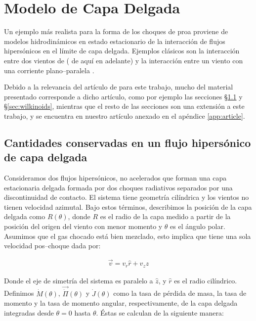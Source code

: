 \chapter{Modelo de Capa Delgada}
\label{chap:hipersonica}
\thispagestyle{empty}
\newcommand\CRW{\citetalias{Canto:1996}}

Un ejemplo más realista para la forma de los choques de proa proviene de modelos hidrodinámicos en estado estacionario de la interacción de flujos hipersónicos en el límite de capa delgada. Ejemplos clásicos son la interacción entre dos vientos de \citet{Canto:1996} (\CRW{} de aquí en adelante) y la interacción entre un viento con una corriente plano--paralela \citep{Wilkin:1996}.

Debido a la relevancia del artículo de \CRW{} para este trabajo, mucho del material presentado corresponde a dicho artículo, como por ejemplo las secciones \S \ref{sec:conserved-CRW} y \S \ref{sec:wilkinoids}, mientras que el resto de las secciones son una extensión a este trabajo, y se encuentra en nuestro artículo anexado en el apéndice \ref{app:article}.
\section{Cantidades conservadas en un flujo hipersónico de capa delgada}
\label{sec:conserved-CRW}
Consideramos dos flujos hipersónicos, no acelerados que forman una capa estacionaria delgada formada por dos choques radiativos separados por una discontinuidad de contacto. El sistema tiene geometría cilíndrica y los vientos no tienen velocidad azimutal. Bajo estos términos, describimos la posición de la capa delgada como $R(\theta)$, donde $R$ es el radio de la capa medido a partir de la posición del origen del viento con menor momento y $\theta$ es el ángulo polar. Asumimos que el gas chocado está bien mezclado, esto implica que  tiene una sola velocidad pos--choque dada por:

\begin{align}
  \vec{v} = v_r \hat{r} + v_z \hat{z}
\end{align}

Donde el eje de simetría del sistema es paralelo a $\hat{z}$, y $\hat{r}$ es el radio cilíndrico. Definimos $\dot{M}(\theta)$, $\vec{\dot{\Pi}}(\theta)$ y $\dot{J}(\theta)$ como la tasa de pérdida de masa, la tasa de momento y la tasa de momento angular, respectivamente, de la capa delgada integradas desde $\theta=0$ hasta $\theta$. Éstas se calculan de la siguiente manera:

